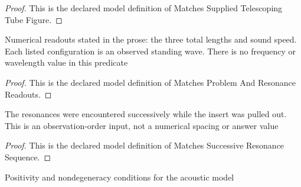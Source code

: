 \begin{proof}
  This is the declared model definition of Matches Supplied Telescoping Tube Figure.
\end{proof}
\begin{definition}
  \label{def:physics:phyx-mini-0184:phyxminiproblems-problemphyxmini0184-matchesproblemandresonancereadouts}
  Numerical readouts stated in the prose: the three total lengths and sound speed. Each listed configuration is an observed standing wave. There is no frequency or wavelength value in this predicate
\end{definition}
\begin{proof}
  This is the declared model definition of Matches Problem And Resonance Readouts.
\end{proof}
\begin{definition}
  \label{def:physics:phyx-mini-0184:phyxminiproblems-problemphyxmini0184-matchessuccessiveresonancesequence}
  The resonances were encountered successively while the insert was pulled out. This is an observation-order input, not a numerical spacing or answer value
\end{definition}
\begin{proof}
  This is the declared model definition of Matches Successive Resonance Sequence.
\end{proof}
\begin{definition}
  \label{def:physics:phyx-mini-0184:phyxminiproblems-problemphyxmini0184-hasphysicalacousticparameters}
  Positivity and nondegeneracy conditions for the acoustic model
\end{definition}
